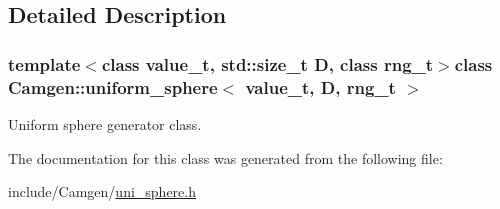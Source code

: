 \subsection{Detailed Description}
\subsubsection*{template$<$class value\+\_\+t, std\+::size\+\_\+t D, class rng\+\_\+t$>$class Camgen\+::uniform\+\_\+sphere$<$ value\+\_\+t, D, rng\+\_\+t $>$}

Uniform sphere generator class. 

The documentation for this class was generated from the following file\+:\begin{DoxyCompactItemize}
\item 
include/\+Camgen/\hyperlink{a00822}{uni\+\_\+sphere.\+h}\end{DoxyCompactItemize}
